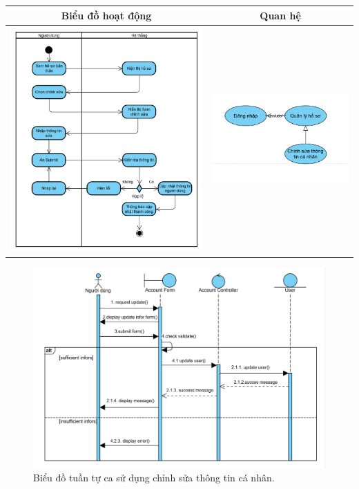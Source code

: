 \noindent 
\begin{tabular}{| c | c |}
    \hline
    \textbf{Biểu đồ hoạt động} & \textbf{Quan hệ} \\ 
    \hline
    \includegraphics[width=0.5\linewidth]{figures/c3/3-3-4-ad.png} 
    & 
    \includegraphics[width=0.45\linewidth]{figures/c3/3-3-4-rd.png} \\ 
    \hline
\end{tabular}



\begin{figure}[H]
    \centering  
    \includegraphics[width=1\textwidth]{figures/c3/3-3-4-sd.png}
    \caption{Biểu đồ tuần tự ca sử dụng chỉnh sửa thông tin cá nhân.}
    \label{fig:3-3-4-sequence-diagram}
\end{figure}